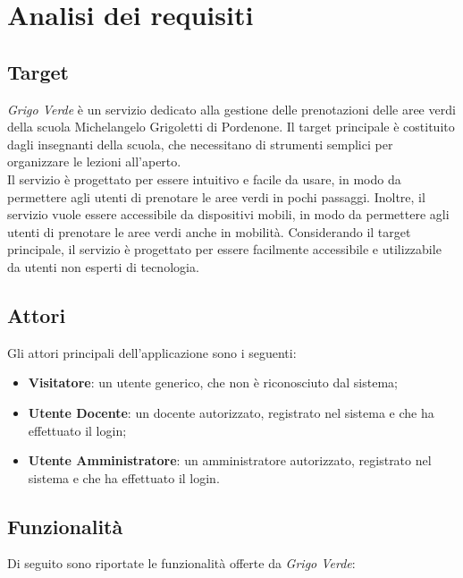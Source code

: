 \section{Analisi dei requisiti}

\subsection{Target}

\textit{Grigo Verde} è un servizio dedicato alla gestione delle prenotazioni
delle aree verdi della scuola Michelangelo Grigoletti di Pordenone. Il target
principale è costituito dagli insegnanti della scuola, che necessitano di
strumenti semplici per organizzare le lezioni all'aperto.\\
Il servizio è progettato per essere intuitivo e facile da usare, in modo
da permettere agli utenti di prenotare le aree verdi in pochi passaggi. Inoltre,
il servizio vuole essere accessibile da dispositivi mobili, in
modo da permettere agli utenti di prenotare le aree verdi anche in mobilità.
Considerando il target principale, il servizio è progettato per essere
facilmente accessibile e utilizzabile da utenti non esperti di tecnologia.

\subsection{Attori}

Gli attori principali dell'applicazione sono i seguenti:

\begin{itemize}
	\item \textbf{Visitatore}: un utente generico, che non è riconosciuto dal
	      sistema;

	\item \textbf{Utente Docente}: un docente autorizzato, registrato nel
	      sistema e che ha effettuato il login;

	\item \textbf{Utente Amministratore}: un amministratore autorizzato,
	      registrato nel sistema e che ha effettuato il login.
\end{itemize}

\subsection{Funzionalità}

Di seguito sono riportate le funzionalità offerte da \textit{Grigo Verde}:

